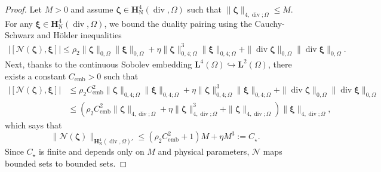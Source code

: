 \documentclass[10pt,a4paper]{amsart}
\newcommand\bH{\mathbf{H}}
\newcommand{\bxi}{\boldsymbol{\xi}}
\newcommand{\bzeta}{\boldsymbol{\zeta}}
\newcommand\cN{\mathcal{N}}
\newcommand\vdiv{\mathop{\mathrm{div}}\nolimits}
\begin{document}
\begin{proof}
    Let $M > 0$ and assume $\bzeta \in\bH^4_{\mathrm{N}}(\vdiv,\Omega)$ such that $\|\bzeta\|_{{4,\vdiv;\Omega}} \le M$. For any $\bxi \in \bH^4_{\mathrm{N}}(\vdiv,\Omega)$, we bound the duality pairing using the Cauchy-Schwarz and Hölder inequalities
    \begin{align*}
        |[\cN(\bzeta), \bxi]|
        \le \rho_2 \|\bzeta\|_{0, \Omega} \|\bxi\|_{0, \Omega} + \eta \|\bzeta\|_{0,4;\Omega}^3 \|\bxi\|_{0,4;\Omega} + \|\vdiv \bzeta\|_{0,\Omega} \|\vdiv \bxi\|_{0,\Omega}.
    \end{align*}
    Next, thanks to the continuous Sobolev embedding $\mathbf{L}^4(\Omega) \hookrightarrow \mathbf{L}^2(\Omega)$, there exists a constant $C_{\text{emb}} > 0$ such that
    \begin{align*}
        |[\cN(\bzeta), \bxi]| &\le \rho_2 C_{\text{emb}}^2 \|\bzeta\|_{0,4;\Omega} \|\bxi\|_{0,4;\Omega} + \eta \|\bzeta\|_{0,4;\Omega}^3 \|\bxi\|_{0,4;\Omega} + \|\vdiv \bzeta\|_{0,\Omega} \|\vdiv \bxi\|_{0,\Omega} \\
        &\le \left( \rho_2 C_{\text{emb}}^2 \|\bzeta\|_{{4,\vdiv;\Omega}} + \eta \|\bzeta\|_{{4,\vdiv;\Omega}}^3 + \|\bzeta\|_{{4,\vdiv;\Omega}} \right) \|\bxi\|_{{4,\vdiv;\Omega}},
    \end{align*}
    which says that
    \begin{equation*}
        \|\cN(\bzeta)\|_{\bH^4_{\mathrm{N}}(\vdiv,\Omega)'} \le (\rho_2 C_{\text{emb}}^2 + 1) M + \eta M^3 := C_\star.
    \end{equation*}
    Since $C_\star$ is finite and depends only on $M$ and physical parameters, $\cN$ maps bounded sets to bounded sets.
\end{proof}
\end{document}
